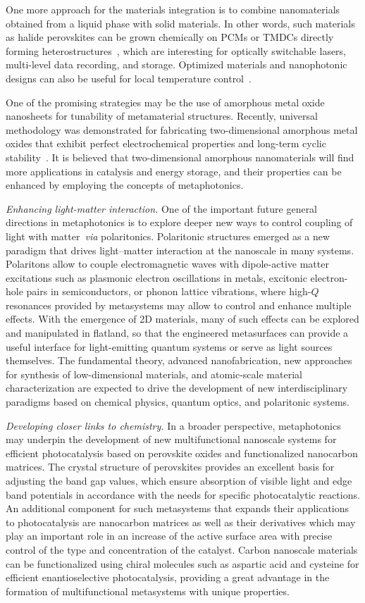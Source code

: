 \documentclass[journal=chreay,manuscript=review]{achemso}
\begin{document}
One more approach for the materials integration is to combine nanomaterials obtained from a liquid phase with solid materials. In other words, such materials as halide perovskites can be grown chemically on PCMs or TMDCs directly forming heterostructures~\cite{voznyy2017engineering}, which are interesting for optically switchable lasers, multi-level data recording, and storage. Optimized materials and nanophotonic designs can also be useful for local temperature control~\cite{zograf2021all}.

One of the promising strategies may be the use of amorphous metal oxide nanosheets for tunability of metamaterial structures. Recently, universal methodology was demonstrated for fabricating two-dimensional amorphous metal oxides  that exhibit perfect electrochemical properties and long-term cyclic stability~\cite{amo}.  It is believed that two-dimensional amorphous nanomaterials will find more applications in catalysis and energy storage, and their properties can be enhanced by employing the concepts of metaphotonics. 

{\it Enhancing light-matter interaction.} One of the important future general directions in metaphotonics is to explore deeper new ways to control coupling of light with matter~\textit{via} polaritonics. Polaritonic structures emerged as a new paradigm that drives light–matter interaction at the nanoscale in many systems. Polaritons allow to couple electromagnetic waves with dipole-active matter excitations such as plasmonic electron oscillations in metals, excitonic electron-hole pairs in semiconductors, or phonon lattice vibrations, where high-$Q$ resonances provided by metasystems may allow to control and enhance multiple effects. With the emergence of 2D materials, many of such effects can be explored and manipulated in flatland, so that the engineered metasurfaces can provide a useful interface for light-emitting quantum systems or serve as light sources themselves. The fundamental theory, advanced nanofabrication, new approaches for synthesis of low-dimensional materials, and atomic-scale material characterization are expected to drive the development of new interdisciplinary paradigms based on chemical physics, quantum optics,  and polaritonic systems. 

{\it Developing closer links to chemistry.} In a broader perspective, metaphotonics may underpin the development of new multifunctional nanoscale systems for efficient photocatalysis based on perovskite oxides and functionalized nanocarbon matrices. The crystal structure of perovskites provides an excellent basis for adjusting the band gap values, which ensure absorption of visible light and edge band potentials in accordance with the needs for specific photocatalytic reactions. An additional component for such metasystems that expands their applications to photocatalysis are nanocarbon matrices as well as their derivatives which may play an important role in an increase of the active surface area with precise control of the type and concentration of the catalyst. Carbon nanoscale materials can be functionalized using chiral molecules such as aspartic acid and cysteine for efficient enantioselective photocatalysis, providing a great advantage in the formation of multifunctional metasystems with unique properties.
\end{document}
